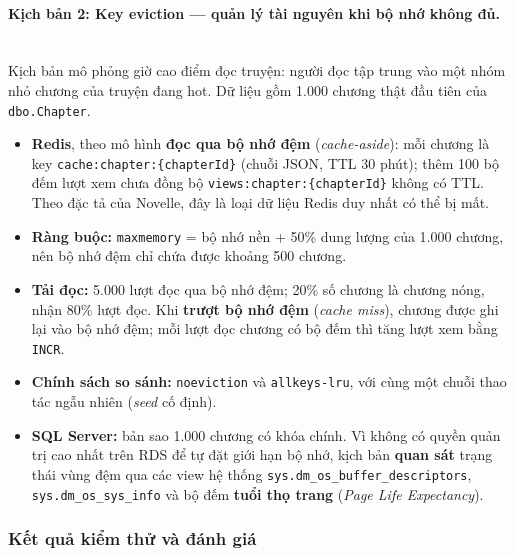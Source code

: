 \paragraph{Kịch bản 2: Key eviction --- quản lý tài nguyên khi bộ nhớ không đủ.}\mbox{}\\
Kịch bản mô phỏng giờ cao điểm đọc truyện: người đọc tập trung vào một nhóm nhỏ chương của truyện đang hot. Dữ liệu gồm 1.000 chương thật đầu tiên của \texttt{dbo.Chapter}.
\begin{itemize}
    \item \textbf{Redis}, theo mô hình \textbf{đọc qua bộ nhớ đệm} (\textit{cache-aside}): mỗi chương là key \texttt{cache:\allowbreak chapter:\allowbreak\{chapterId\}} (chuỗi JSON, TTL 30 phút); thêm 100 bộ đếm lượt xem chưa đồng bộ \texttt{views:\allowbreak chapter:\allowbreak\{chapterId\}} không có TTL. Theo đặc tả của Novelle, đây là loại dữ liệu Redis duy nhất có thể bị mất.
    \item \textbf{Ràng buộc:} \texttt{maxmemory} = bộ nhớ nền + 50\% dung lượng của 1.000 chương, nên bộ nhớ đệm chỉ chứa được khoảng 500 chương.
    \item \textbf{Tải đọc:} 5.000 lượt đọc qua bộ nhớ đệm; 20\% số chương là chương nóng, nhận 80\% lượt đọc. Khi \textbf{trượt bộ nhớ đệm} (\textit{cache miss}), chương được ghi lại vào bộ nhớ đệm; mỗi lượt đọc chương có bộ đếm thì tăng lượt xem bằng \texttt{INCR}.
    \item \textbf{Chính sách so sánh:} \texttt{noeviction} và \texttt{allkeys-lru}, với cùng một chuỗi thao tác ngẫu nhiên (\textit{seed} cố định).
    \item \textbf{SQL Server:} bản sao 1.000 chương có khóa chính. Vì không có quyền quản trị cao nhất trên RDS để tự đặt giới hạn bộ nhớ, kịch bản \textbf{quan sát} trạng thái vùng đệm qua các view hệ thống \texttt{sys.dm\_os\_buffer\_descriptors}, \texttt{sys.dm\_os\_sys\_info} và bộ đếm \textbf{tuổi thọ trang} (\textit{Page Life Expectancy}).
\end{itemize}

\subsubsection{Kết quả kiểm thử và đánh giá}
\label{subsubsec:ds-evaluation}

